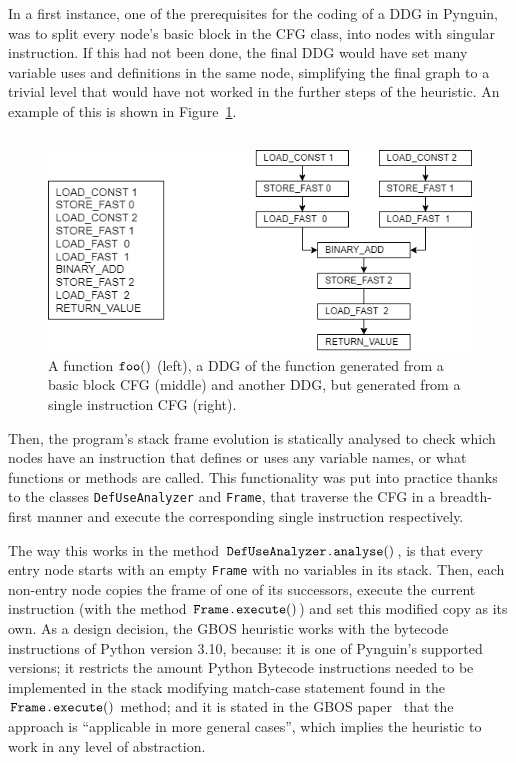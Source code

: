 \documentclass[%
  chapterprefix=false,%
  open=right,%
  twoside=true,%
  paper=a4,%
  logofile={Figures/logo.png},%
  thesistype=master,%
  UKenglish,%
]{se2thesis}
\newcommand{\classname}[1]{\texttt{#1}}
\newcommand{\callable}[2][]{\(\text{\texttt{#2}}(#1)\)}
\begin{document}
In a first instance, one of the prerequisites for the coding of a DDG in Pynguin, was to split every node's basic block in the CFG class, into nodes with singular instruction.
If this had not been done, the final DDG would have set many variable uses and definitions in the same node, simplifying the final graph to a trivial level that would have not worked in the further steps of the heuristic.
An example of this is shown in Figure~\ref{fig:ddg_example}.

\begin{figure}[htb]
  
\end{figure}

\begin{figure}[htb]
    \inputminted{python}{Figures/basic_block.py}
  \endminipage\hfill
    \includegraphics[width=\textwidth]{Figures/DDG.png}
  \endminipage\hfill
  \caption{A function \callable{foo} (left), a DDG of the function generated from a basic block CFG (middle) and another DDG, but generated from a single instruction CFG (right).}\label{fig:ddg_example}
\end{figure}


Then, the program's stack frame evolution is statically analysed to check which nodes have an instruction that defines or uses any variable names, or what functions or methods are called. %
This functionality was put into practice thanks to the classes \classname{DefUseAnalyzer} and \classname{Frame}, that traverse the CFG in a breadth-first manner and execute the corresponding single instruction respectively.

The way this works in the method \callable{DefUseAnalyzer.analyse}, is that every entry node starts with an empty \classname{Frame} with no variables in its stack.
Then, each non-entry node copies the frame of one of its successors, execute the current instruction (with the method \callable{Frame.execute}) and set this modified copy as its own.
As a design decision, the GBOS heuristic works with the bytecode instructions of Python version 3.10, because: it is one of Pynguin's supported versions; it restricts the amount Python Bytecode instructions needed to be implemented in the stack modifying match-case statement found in the \callable{Frame.execute} method; and it is stated in the GBOS paper~\cite{DBLP:conf/sigsoft/0001O00D21} that the approach is ``applicable in more general cases'', which implies the heuristic to work in any level of abstraction.
\end{document}
